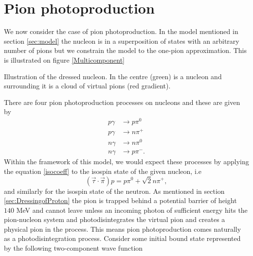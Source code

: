 \chapter{Pion photoproduction}\label{sec:PionPhotoproduction}
We now consider the case of pion photoproduction. In the model mentioned in section \ref{sec:model} the nucleon is in a superposition of states with an arbitrary number of pions but we constrain the model to the one-pion approximation. This is illustrated on figure \ref{Multicomponent}
\begin{marginfigure}
	\centering
	
	\caption{Illustration of the dressed nucleon. In the centre (green) is a nucleon and surrounding it is a cloud of virtual pions (red gradient). }
	\label{Multicomponent}
\end{marginfigure}
There are four pion photoproduction processes on nucleons and these are given by
\begin{align}
	p \gamma & \rightarrow p \pi^0 \label{photonew1}\\
	p \gamma & \rightarrow n \pi^+ \label{photonew2}\\
	n \gamma & \rightarrow n \pi^0 \label{photonew3}\\
	n \gamma & \rightarrow p \pi^- \label{photonew4}.
\end{align}
Within the framework of this model, we would expect these processes by applying the equation \eqref{isocoeff} to the isospin state of the given nucleon, i.e
\begin{equation} \label{isovectorex}
	(\vec{\tau}\cdot\vec{\pi}) p = p\pi^0 + \sqrt{2}n\pi^+,
\end{equation}
and similarly for the isospin state of the neutron. As mentioned in section \ref{sec:DressingofProton} the pion is trapped behind a potential barrier of height $140$ MeV and cannot leave unless an incoming photon of sufficient energy hits the pion-nucleon system and photodisintegrates the virtual pion and creates a physical pion in the process. This means pion photoproduction comes naturally as a photodisintegration process. Consider some initial bound state represented by the following two-component wave function

